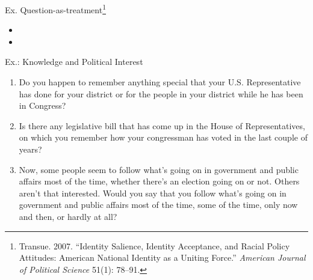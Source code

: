 \documentclass[
  ignorenonframetext,
]{beamer}
\begin{document}
\begin{frame}{Ex.
Question-as-treatment\footnote{Transue. 2007. ``Identity Salience, Identity Acceptance, and Racial Policy Attitudes: {American} National Identity as a Uniting Force.'' \textit{American Journal of Political Science} 51(1): 78--91.}}
\protect\hypertarget{ex.-question-as-treatment}{}
\begin{itemize}
\item {}
\item {}
\end{itemize}
\end{frame}

\begin{frame}{\normalsize Ex.: Knowledge and Political Interest}
\protect\hypertarget{ex.-knowledge-and-political-interest}{}
\footnotesize

\begin{enumerate}
\item Do you happen to remember anything special that your U.S. Representative has done for your district or for the people in your district while he has been in Congress?
\item Is there any legislative bill that has come up in the House of Representatives, on which you remember how your congressman has voted in the last couple of years?
\item Now, some people seem to follow what's going on in government and public affairs most of the time, whether there's an election going on or not. Others aren't that interested. Would you say that you follow what's going on in government and public affairs most of the time, some of the time, only now and then, or hardly at all?
\end{enumerate}
\end{frame}
\end{document}
